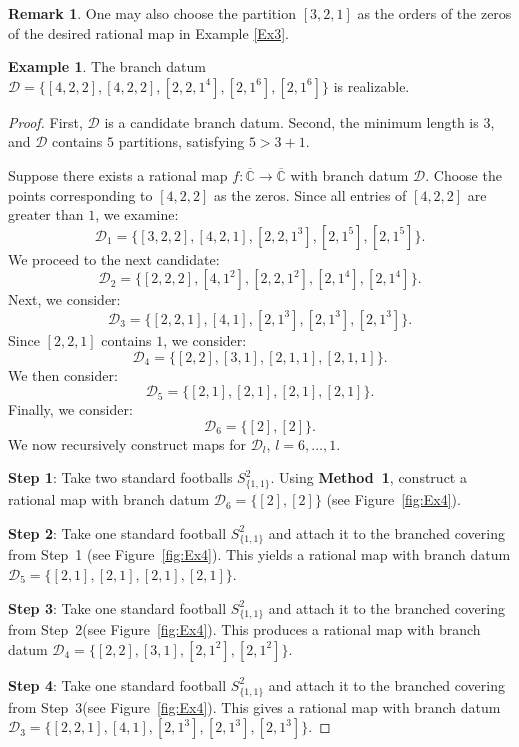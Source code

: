 \documentclass[microtype]{gtpart}     %
\theoremstyle{definition}
\newtheorem{remark}{Remark}             %
\newtheorem{ex}{Example}[section]
\begin{document}
\begin{remark}
One may also choose the partition $[3,2,1]$ as the orders of the zeros of the desired rational map in Example \ref{Ex3}.
\end{remark}



\begin{ex}\label{Ex4}
The branch datum $\mathcal{D} = \{[4,2,2], [4,2,2], [2,2,1^4], [2,1^6], [2,1^6]\}$ is realizable.
\end{ex}

\begin{proof}
First, $\mathcal{D}$ is a candidate branch datum. Second, the minimum length is $3$, and $\mathcal{D}$ contains $5$ partitions, satisfying $5 > 3 + 1$.

Suppose there exists a rational map $f:\overline{\mathbb{C}}\rightarrow \overline{\mathbb{C}}$ with branch datum $\mathcal{D}$. Choose the points corresponding to $[4,2,2]$ as the zeros. Since all entries of $[4,2,2]$ are greater than $1$, we examine:
\[
\mathcal{D}_1 = \{[3,2,2], [4,2,1], [2,2,1^3], [2,1^5], [2,1^5]\}.
\]
We proceed to the next candidate:
\[
\mathcal{D}_2 = \{[2,2,2], [4,1^2], [2,2,1^2], [2,1^4], [2,1^4]\}.
\]
Next, we consider:
\[
\mathcal{D}_3 = \{[2,2,1], [4,1], [2,1^3], [2,1^3], [2,1^3]\}.
\]
Since $[2,2,1]$ contains $1$, we consider:
\[
\mathcal{D}_4 = \{[2,2], [3,1], [2,1,1], [2,1,1]\}.
\]
We then consider:
\[
\mathcal{D}_5 = \{[2,1], [2,1], [2,1], [2,1]\}.
\]
Finally, we consider:
\[
\mathcal{D}_6 = \{[2], [2]\}.
\]
We now recursively construct maps for $\mathcal{D}_l$, $l = 6, \ldots, 1$.

\noindent \textbf{Step 1}: Take two standard footballs $S^{2}_{\{1,1\}}$. Using \textbf{Method~1}, construct a rational map with branch datum $\mathcal{D}_6 = \{[2], [2]\}$ (see Figure~\ref{fig:Ex4}).

\noindent \textbf{Step 2}: Take one standard football $S^{2}_{\{1,1\}}$ and attach it to the branched covering from Step~1 (see Figure~\ref{fig:Ex4}). This yields a rational map with branch datum $\mathcal{D}_5 = \{[2,1], [2,1], [2,1], [2,1]\}$.

\noindent \textbf{Step 3}: Take one standard football $S^{2}_{\{1,1\}}$ and attach it to the branched covering from Step~2(see Figure~\ref{fig:Ex4}). This produces a rational map with branch datum $\mathcal{D}_4 = \{[2,2], [3,1], [2,1^2], [2,1^2]\}$.

\noindent \textbf{Step 4}: Take one standard football $S^{2}_{\{1,1\}}$ and attach it to the branched covering from Step~3(see Figure~\ref{fig:Ex4}). This gives a rational map with branch datum $\mathcal{D}_3 = \{[2,2,1], [4,1], [2,1^3], [2,1^3], [2,1^3]\}$.


\end{proof}
\end{document}
